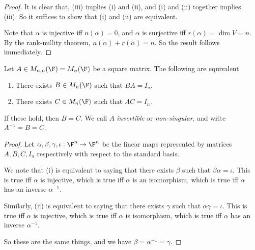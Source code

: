 \documentclass[a4paper]{article}
\begin{document}
\begin{proof}
  It is clear that, (iii) implies (i) and (ii), and (i) and (ii) together implies (iii). So it suffices to show that (i) and (ii) are equivalent.

  Note that $\alpha$ is injective iff $n(\alpha) = 0$, and $\alpha$ is surjective iff $r(\alpha) = \dim V = n$. By the rank-nullity theorem, $n(\alpha) + r(\alpha) = n$. So the result follows immediately.
\end{proof}

\begin{lemma}
  Let $A \in M_{n, n}(\F) = M_n(\F)$ be a square matrix. The following are equivalent
  \begin{enumerate}
    \item There exists $B\in M_n (\F)$ such that $BA = I_n$.
    \item There exists $C\in M_n (\F)$ such that $AC = I_n$.
  \end{enumerate}
  If these hold, then $B = C$. We call $A$ \emph{invertible} or \emph{non-singular}, and write $A^{-1} = B = C$.
\end{lemma}

\begin{proof}
  Let $\alpha, \beta, \gamma, \iota: \F^n \to \F^n$ be the linear maps represented by matrices $A, B, C, I_n$ respectively with respect to the standard basis.

  We note that (i) is equivalent to saying that there exists $\beta$ such that $\beta\alpha = \iota$. This is true iff $\alpha$ is injective, which is true iff $\alpha$ is an isomorphism, which is true iff $\alpha$ has an inverse $\alpha^{-1}$.

  Similarly, (ii) is equivalent to saying that there exists $\gamma$ such that $\alpha\gamma = \iota$. This is true iff $\alpha$ is injective, which is true iff $\alpha$ is isomorphism, which is true iff $\alpha$ has an inverse $\alpha^{-1}$.

  So these are the same things, and we have $\beta = \alpha^{-1} = \gamma$.
\end{proof}
\end{document}
